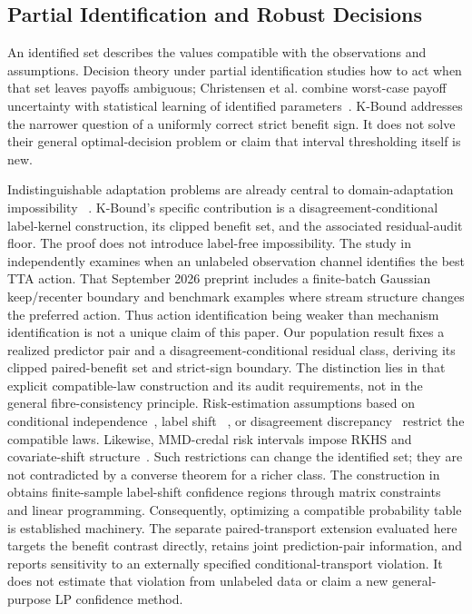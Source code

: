 \subsection{Partial Identification and Robust Decisions}

An identified set describes the values compatible with the observations and assumptions.
Decision theory under partial identification studies how to act when that set leaves payoffs
ambiguous; Christensen et al. combine worst-case payoff uncertainty with statistical learning of
identified parameters~\cite{christensen2026optimal}. K-Bound addresses the narrower question of
a uniformly correct strict benefit sign. It does not solve their general optimal-decision problem
or claim that interval thresholding itself is new.

Indistinguishable adaptation problems are already central to domain-adaptation impossibility
~\cite{bendavid2010theory,bendavid2010impossibility}. K-Bound's specific contribution is a
disagreement-conditional label-kernel construction, its clipped benefit set, and the associated
residual-audit floor. The proof does not introduce label-free impossibility.
The study in \cite{jhawar2026identifiable} independently examines when an unlabeled
observation channel identifies the best TTA action. That September 2026 preprint
includes a finite-batch Gaussian keep/recenter boundary and benchmark examples
where stream structure changes the preferred action. Thus action identification
being weaker than mechanism identification is not a unique claim of this paper.
Our population result fixes a realized predictor pair and a disagreement-conditional
residual class, deriving its clipped paired-benefit set and strict-sign boundary.
The distinction lies in that explicit compatible-law construction and its audit
requirements, not in the general fibre-consistency principle.
Risk-estimation assumptions based on conditional independence~\cite{steinhardt2016}, label shift
~\cite{lipton2018bbse,garg2020labelshift}, or disagreement discrepancy~\cite{rosenfeld2023dis2}
restrict the compatible laws. Likewise, MMD-credal risk intervals impose RKHS and covariate-shift
structure~\cite{ariq2026mmd}. Such restrictions can change the identified set; they are not
contradicted by a converse theorem for a richer class.
The construction in \cite{li2026matrixconstraints} obtains finite-sample label-shift
confidence regions through matrix constraints and linear programming. Consequently,
optimizing a compatible probability table is established machinery. The separate
paired-transport extension evaluated here targets the benefit contrast directly,
retains joint prediction-pair information, and reports sensitivity to an externally
specified conditional-transport violation. It does not estimate that violation
from unlabeled data or claim a new general-purpose LP confidence method.

